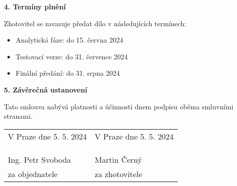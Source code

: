 \documentclass[a4paper,12pt]{article}
\begin{document}
\vspace{0.5cm}

\textbf{4. Termíny plnění}

Zhotovitel se zavazuje předat dílo v následujících termínech:
\begin{itemize}
    \item Analytická fáze: do 15. června 2024
    \item Testovací verze: do 31. července 2024
    \item Finální předání: do 31. srpna 2024
\end{itemize}

\vspace{0.5cm}

\textbf{5. Závěrečná ustanovení}

Tato smlouva nabývá platnosti a účinnosti dnem podpisu oběma smluvními stranami.

\vspace{2cm}

\begin{tabular}{p{7cm}p{7cm}}
V Praze dne 5. 5. 2024 & V Praze dne 5. 5. 2024 \\
\\
\\
\dotfill & \dotfill \\
Ing. Petr Svoboda & Martin Černý \\
za objednatele & za zhotovitele
\end{tabular}
\end{document}
